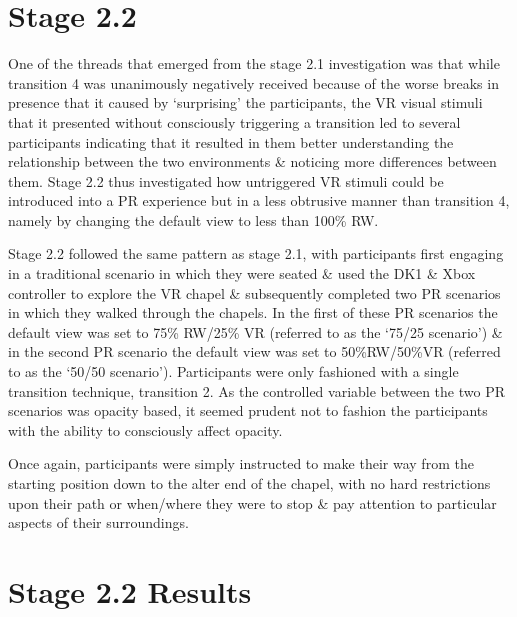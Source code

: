 
\clearpage


\section{Stage 2.2}

One of the threads that emerged from the stage 2.1 investigation was that while transition 4 was unanimously negatively received because of the worse breaks in presence that it caused by `surprising' the participants, the VR visual stimuli that it presented without consciously triggering a transition led to several participants indicating that it resulted in them better understanding the relationship between the two environments \& noticing more differences between them. Stage 2.2 thus investigated how untriggered VR stimuli could be introduced into a PR experience but in a less obtrusive manner than transition 4, namely by changing the default view to less than 100\% RW.

Stage 2.2 followed the same pattern as stage 2.1, with participants first engaging in a traditional scenario in which they were seated \& used the DK1 \& Xbox controller to explore the VR chapel \& subsequently completed two PR scenarios in which they walked through the chapels. In the first of these PR scenarios the default view was set to 75\% RW/25\% VR (referred to as the `75/25 scenario') \& in the second PR scenario the default view was set to 50\%RW/50\%VR (referred to as the `50/50 scenario'). Participants were only fashioned with a single transition technique, transition 2. As the controlled variable between the two PR scenarios was opacity based, it seemed prudent not to fashion the participants with the ability to consciously affect opacity.

Once again, participants were simply instructed to make their way from the starting position down to the alter end of the chapel, with no hard restrictions upon their path or when/where they were to stop \& pay attention to particular aspects of their surroundings.


\section{Stage 2.2 Results}

